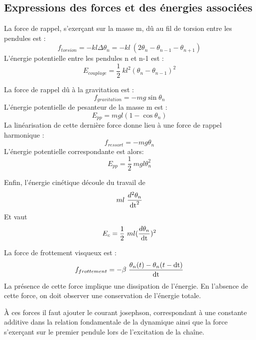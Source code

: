 \subsection{Expressions des forces et des énergies associées}

La force de rappel, s'exerçant sur la masse m, dû au fil de torsion entre les pendules est :
\[
f_{torsion} = -  k l \Delta \theta _n = -  k l\ (2\theta _n-\theta _{n-1}-\theta _{n+1})
\]
L'énergie potentielle entre les pendules n et n-1 est :
\[
E_{couplage} = \frac{1}{2}\ k l^2 (\theta _n-\theta _{n-1})^2
\]

La force de rappel dû à la gravitation est :
\[
f_{gravitation} = - m g \sin{\theta _n}
\]
L'énergie potentielle de pesanteur de la masse m est :
\[
E_{pp} = m g l (1 - \cos{\theta _n})
\]
La linéarisation de cette dernière force donne lieu à une force de rappel harmonique :
\[
f_{ressort} = - m g \theta _n
\]
L'énergie potentielle correspondante est alors:
\[
E_{pp} = \frac{1}{2}\ m g l \theta _n^2
\]

Enfin, l'énergie cinétique découle du travail de 
\[
m l\ \frac{d^2 \theta _n}{\operatorname{dt}^2}
\]
%
Et vaut
\[
E_{c} = \frac{1}{2}\ m l (\frac{d \theta _n}{\operatorname{dt}})^2
\]


La force de frottement visqueux est :
%
\[
f_{frottement} = -  \beta\ \frac{\theta _n(t) - \theta _n(t-\operatorname{dt})}{\operatorname{dt}}
\]
%
La présence de cette force implique une dissipation de l'énergie. En l'absence de cette force, on doit observer une conservation de l'énergie totale.

À ces forces il faut ajouter le courant josephson, correspondant à une constante additive dans la relation fondamentale de la dynamique ainsi que la force s'exerçant sur le premier pendule lors de l'excitation de la chaîne.
